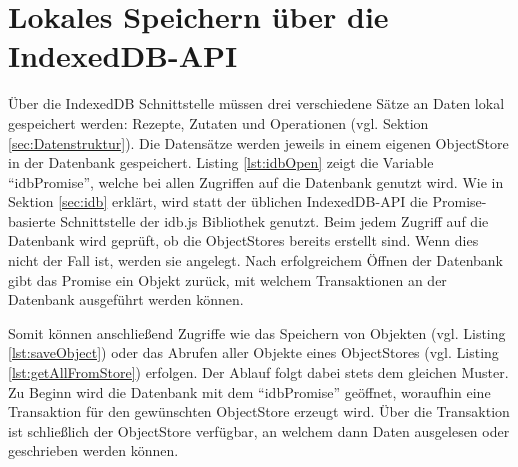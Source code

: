 \documentclass[a4paper, 12pt]{scrreprt}
\begin{document}
\begin{minipage}{\linewidth}
	
\end{minipage}

\begin{minipage}{\linewidth}
	
\end{minipage}

\section{Lokales Speichern über die IndexedDB-API}
\label{sec:lokalesIndexeddb}

Über die IndexedDB Schnittstelle müssen drei verschiedene Sätze an Daten lokal gespeichert werden: Rezepte, Zutaten und Operationen (vgl. Sektion \ref{sec:Datenstruktur}). Die Datensätze werden jeweils in einem eigenen ObjectStore in der Datenbank gespeichert. Listing \ref{lst:idbOpen} zeigt die Variable \enquote{idbPromise}, welche bei allen Zugriffen auf die Datenbank genutzt wird. Wie in Sektion \ref{sec:idb} erklärt, wird statt der üblichen IndexedDB-API die Promise-basierte Schnittstelle der idb.js Bibliothek genutzt. Beim jedem Zugriff auf die Datenbank wird geprüft, ob die ObjectStores bereits erstellt sind. Wenn dies nicht der Fall ist, werden sie angelegt. Nach erfolgreichem Öffnen der Datenbank gibt das Promise ein Objekt zurück, mit welchem Transaktionen an der Datenbank ausgeführt werden können.

\begin{minipage}{\linewidth}
	
\end{minipage}

Somit können anschließend Zugriffe wie das Speichern von Objekten (vgl. Listing \ref{lst:saveObject}) oder das Abrufen aller Objekte eines ObjectStores (vgl. Listing \ref{lst:getAllFromStore}) erfolgen. Der Ablauf folgt dabei stets dem gleichen Muster. Zu Beginn wird die Datenbank mit dem \enquote{idbPromise} geöffnet, woraufhin eine Transaktion für den gewünschten ObjectStore erzeugt wird. Über die Transaktion ist schließlich der ObjectStore verfügbar, an welchem dann Daten ausgelesen oder geschrieben werden können.

\begin{minipage}{\linewidth}
	
\end{minipage}
\end{document}
